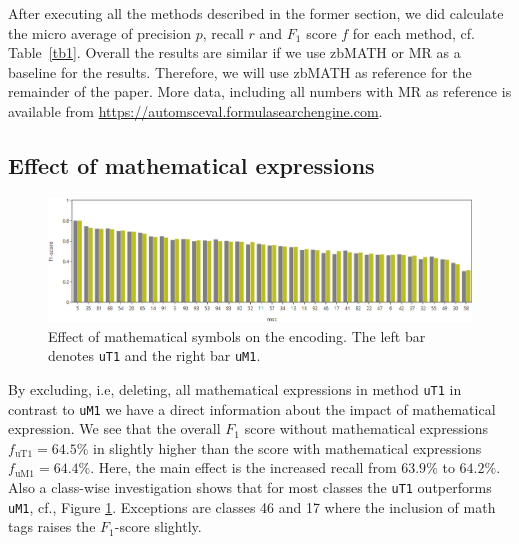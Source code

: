 After executing all the methods described in the former section, we did calculate the micro average of precision $p$, recall $r$ and $F_1$ score $f$ for each method, cf. Table~\ref{tb1}.
Overall the results are similar if we use zbMATH or MR as a baseline for the results.
Therefore, we will use zbMATH as reference for the remainder of the paper.
More data, including all numbers with MR as reference is available from
\url{https://automsceval.formulasearchengine.com}.

\subsection{Effect of mathematical expressions}
\begin{figure}[ht]
  \centering
  \includegraphics[width=1.1\textwidth]{mathEncoding.png}
  \caption{Effect of mathematical symbols on the encoding. The left bar denotes {\texttt{uT1}} and the right bar {\texttt{uM1}}. }\label{fgMath}
\end{figure}
By excluding, i.e, deleting, all mathematical expressions in method \texttt{uT1} in contrast to \texttt{uM1} we have a direct information about the impact of mathematical expression.
We see that the overall $F_1$ score without mathematical expressions $f_\mathrm{uT1}=64.5\%$ in slightly higher than the score with mathematical expressions $f_\mathrm{uM1}=64.4\%.$ 
Here, the main effect is the increased recall from $63.9\%$ to $64.2\%.$
Also a class-wise investigation shows that for most classes the \texttt{uT1} outperforms \texttt{uM1}, cf., Figure \ref{fgMath}.
Exceptions are classes 46 and 17 where the inclusion of math tags raises the $F_1$-score slightly.

